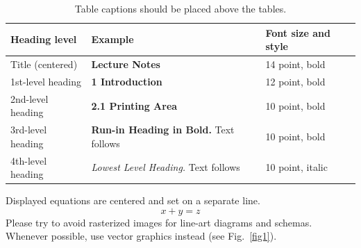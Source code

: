 \documentclass[runningheads]{llncs}
\begin{document}
\begin{table}
\caption{Table captions should be placed above the
tables.}\label{tab1}
\begin{tabular}{|l|l|l|}
\hline
Heading level &  Example & Font size and style\\
\hline
Title (centered) &  {\Large\bfseries Lecture Notes} & 14 point, bold\\
1st-level heading &  {\large\bfseries 1 Introduction} & 12 point, bold\\
2nd-level heading & {\bfseries 2.1 Printing Area} & 10 point, bold\\
3rd-level heading & {\bfseries Run-in Heading in Bold.} Text follows & 10 point, bold\\
4th-level heading & {\itshape Lowest Level Heading.} Text follows & 10 point, italic\\
\hline
\end{tabular}
\end{table}


\noindent Displayed equations are centered and set on a separate
line.
\begin{equation}
x + y = z
\end{equation}
Please try to avoid rasterized images for line-art diagrams and
schemas. Whenever possible, use vector graphics instead (see
Fig.~\ref{fig1}).

\end{document}
